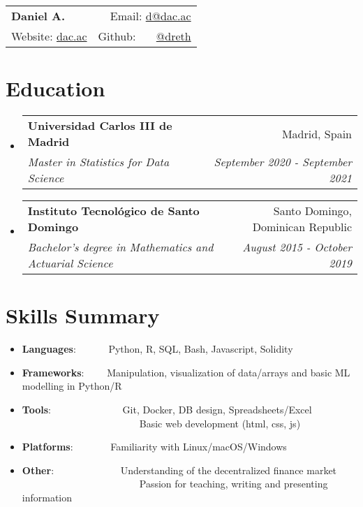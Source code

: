 \documentclass[a4paper,20pt]{article}
\makeatletter
\newcommand{\resumeItem}[2]{
  \item\small{
    \textbf{#1}{: #2 \vspace{-2pt}}
  }
}
\newcommand{\resumeSubheading}[4]{
  \vspace{-1pt}\item
    \begin{tabular*}{0.97\textwidth}{l@{\extracolsep{\fill}}r}
      \textbf{#1} & #2 \\
      \textit{#3} & \textit{#4} \\
    \end{tabular*}\vspace{-5pt}
}
\newcommand{\resumeSubItem}[2]{\resumeItem{#1}{#2}\vspace{-3pt}}
\newcommand{\resumeSubHeadingListStart}{\begin{itemize}[leftmargin=*]}
\newcommand{\resumeSubHeadingListEnd}{\end{itemize}}
\makeatother
\begin{document}
\begin{tabular*}{\textwidth}{l@{\extracolsep{\fill}}r}
  \textbf{{\LARGE Daniel A.}} & Email: {\color{blue}\href{mailto:}{d@dac.ac}}\\
  Website: {\color{blue}\href{https://dac.ac}{dac.ac}} & Github: ~~~{\color{blue}\href{https://github.com/dreth}{@dreth}}
\end{tabular*}




            
\vspace{-4pt}
\section{Education}
\resumeSubHeadingListStart
        
  \resumeSubheading
    {Universidad Carlos III de Madrid}{Madrid, Spain}
    {Master in Statistics for Data Science}{September 2020 - September 2021}
\vspace{-2pt}
  \resumeSubheading
    {Instituto Tecnológico de Santo Domingo}{Santo Domingo, Dominican Republic}
    {Bachelor's degree in Mathematics and Actuarial Science}{August 2015 - October 2019}
\resumeSubHeadingListEnd


            
\vspace{-7pt}
\section{Skills Summary}
  \resumeSubHeadingListStart
            
        
\vspace{-2pt}
\resumeSubItem{Languages}{~~~~~~Python, R, SQL, Bash, Javascript, Solidity}
\vspace{-2pt}
\resumeSubItem{Frameworks}{~~~~Manipulation, visualization of data/arrays and basic ML modelling in Python/R}
\vspace{-2pt}
\resumeSubItem{Tools}{~~~~~~~~~~~~~~Git, Docker, DB design, Spreadsheets/Excel\\~~~~~~~~~~~~~~~~~~~~~~~~Basic web development (html, css, js)}
\vspace{-2pt}
\resumeSubItem{Platforms}{~~~~~~~Familiarity with Linux/macOS/Windows}
\vspace{-2pt}
\resumeSubItem{Other}{~~~~~~~~~~~~~Understanding of the decentralized finance market\\~~~~~~~~~~~~~~~~~~~~~~~~Passion for teaching, writing and presenting information}
\resumeSubHeadingListEnd
\end{document}
